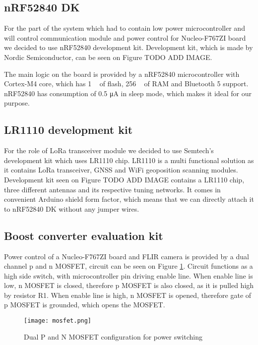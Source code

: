\subsection{ nRF52840 DK}

For the part of the system which had to contain low power microcontroller and will control communication module and power control for Nucleo-F767ZI board we decided to use nRF52840 development kit.
Development kit, which is made by Nordic Semiconductor, can be seen on Figure TODO ADD IMAGE.

The main logic on the board is provided by a nRF52840 microcontroller with Cortex-M4 core, which has 1 \si{\mega\byte} of flash, 256 \si{\kilo\byte} of RAM and Bluetooth 5 support.
nRF52840 has consumption of 0.5 \si{\micro\ampere} in sleep mode, which makes it ideal for our purpose.


\subsection{ LR1110 development kit}

For the role of LoRa transceiver module we decided to use Semtech's development kit which uses LR1110 chip.
LR1110 is a multi functional solution as it contains LoRa transceiver, GNSS and WiFi geoposition scanning modules.
Development kit seen on Figure TODO ADD IMAGE contains a LR1110 chip, three different antennas and its respective tuning networks.
It comes in convenient Arduino shield form factor, which means that we can directly attach it to nRF52840 DK without any jumper wires.


\subsection{ Boost converter evaluation kit}

Power control of a Nucleo-F767ZI board and FLIR camera is provided by a dual channel p and n MOSFET, circuit can be seen on Figure \ref{mosfet}.
Circuit functions as a high side switch, with microcontroller pin driving enable line.
When enable line is low, n MOSFET is closed, therefore p MOSFET is also closed, as it is pulled high by resistor R1.
When enable line is high, n MOSFET is opened, therefore gate of p MOSFET is grounded, which opens the MOSFET.

\begin{figure}[ht]
        \centering
        \texttt{[image: mosfet.png]} 
        \caption{ Dual P and N MOSFET configuration for power switching}
        \label{mosfet}
\end{figure}

